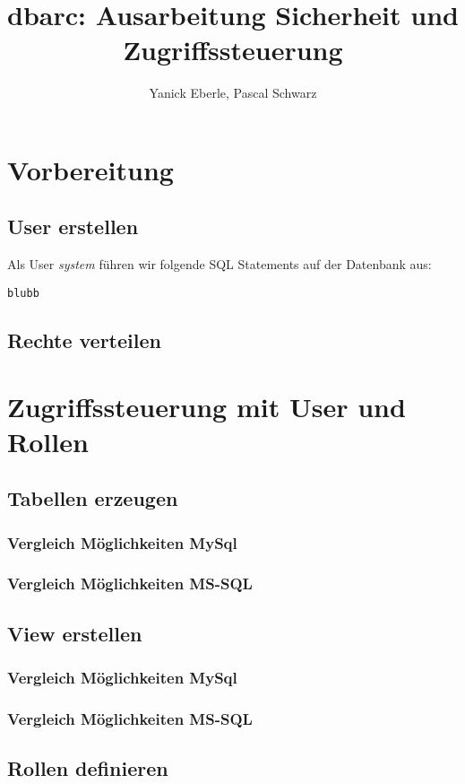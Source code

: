 \documentclass[11pt,a4paper,parskip=half]{scrartcl}
\title{dbarc: Ausarbeitung Sicherheit und Zugriffssteuerung}
\author{Yanick Eberle, Pascal Schwarz}
\begin{document}
\maketitle
\vfill
\tableofcontents

\pagestyle{fancy}
\section{Vorbereitung}
\subsection{User erstellen}
Als User \emph{system} führen wir folgende SQL Statements auf der Datenbank aus:

\begin{lstlisting}
blubb
\end{lstlisting}
\subsection{Rechte verteilen}


\section{Zugriffssteuerung mit User und Rollen}
\subsection{Tabellen erzeugen}
\subsubsection{Vergleich Möglichkeiten MySql}
\subsubsection{Vergleich Möglichkeiten MS-SQL}

\subsection{View erstellen}
\subsubsection{Vergleich Möglichkeiten MySql}
\subsubsection{Vergleich Möglichkeiten MS-SQL}

\subsection{Rollen definieren}
\end{document}
